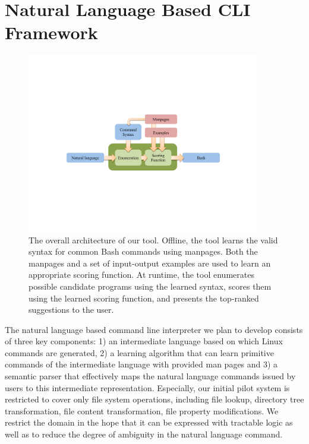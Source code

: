 
\section{Natural Language Based CLI Framework}

\begin{figure}[h]
    \begin{center} \includegraphics[width=4in]{architecture.pdf} \end{center}
    \caption{The overall architecture of our tool. Offline, the tool learns the
        valid syntax for common Bash commands using manpages. Both the manpages
        and a set of input-output examples are used to learn an appropriate
        scoring function. At runtime, the tool enumerates possible candidate
        programs using the learned syntax, scores them using the learned scoring
        function, and presents the top-ranked suggestions to the user.}
    \label{fig:arch}
\end{figure}

The natural language based command line interpreter we plan to develop consists of three key components: 1) an intermediate language  based on which Linux commands are generated, 2) a learning algorithm that can learn primitive commands of the intermediate language with provided man pages and 3) a semantic parser that effectively maps the natural language commands issued by users to this intermediate representation. Especially, our initial pilot system is restricted to cover only file system operations, including file lookup, directory tree transformation, file content transformation, file property modifications. We restrict the domain in the hope that it can be expressed with tractable logic as well as to reduce the degree of ambiguity in the natural language command.

